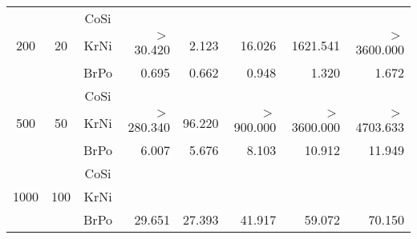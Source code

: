 \begin{tabular}{|c|c|c|r|r|r|r|r|}
  \hline
  \multirow{3}{*}{200}&
  \multirow{3}{*}{20}&
     CoSi &      \skip &      \skip &      \skip &      \skip &      \skip \\
  && KrNi &  $>$30.420 &      2.123 &     16.026 &    1621.541 & $>$3600.000 \\
  && BrPo &      0.695 &      0.662 &      0.948 &      1.320 &      1.672 \\
  \hline
  \multirow{3}{*}{500}&
  \multirow{3}{*}{50}&
     CoSi &      \skip &      \skip &      \skip &      \skip &      \skip \\
  && KrNi & $>$280.340 &     96.220 & $>$900.000 & $>$3600.000 & $>$4703.633 \\
  && BrPo &      6.007 &      5.676 &      8.103 &     10.912 &     11.949 \\
  \hline
  \multirow{3}{*}{1000}&
  \multirow{3}{*}{100}&
     CoSi &      \skip &      \skip &      \skip &      \skip &      \skip \\
  && KrNi &      \skip &      \skip &      \skip &      \skip &      \skip \\
  && BrPo &     29.651 &     27.393 &     41.917 &     59.072 &     70.150 \\
  \hline
\end{tabular}
